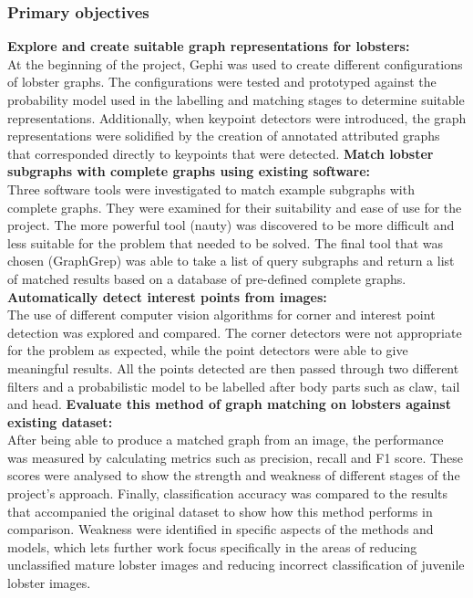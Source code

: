 \subsubsection{Primary objectives}
\textbf{Explore and create suitable graph representations for lobsters:} \\
At the beginning of the project, Gephi was used to create different configurations of lobster graphs. The configurations were tested and prototyped against the probability model used in the labelling and matching stages to determine suitable representations. Additionally, when keypoint detectors were introduced, the graph representations were solidified by the creation of annotated attributed graphs that corresponded directly to keypoints that were detected. 
\n
\textbf{Match lobster subgraphs with complete graphs using existing software:} \\
Three software tools were investigated to match example subgraphs with complete graphs. They were examined for their suitability and ease of use for the project. The more powerful tool (nauty) was discovered to be more difficult and less suitable for the problem that needed to be solved. The final tool that was chosen (GraphGrep) was able to take a list of query subgraphs and return a list of matched results based on a database of pre-defined complete graphs. 
\n
\textbf{Automatically detect interest points from images:} \\
The use of different computer vision algorithms for corner and interest point detection was explored and compared. The corner detectors were not appropriate for the problem as expected, while the point detectors were able to give meaningful results. All the points detected are then passed through two different filters and a probabilistic model to be labelled after body parts such as claw, tail and head. 
\n
\textbf{Evaluate this method of graph matching on lobsters against existing dataset:} \\
After being able to produce a matched graph from an image, the performance was measured by calculating metrics such as precision, recall and F1 score. These scores were analysed to show the strength and weakness of different stages of the project's approach. Finally, classification accuracy was compared to the results that accompanied the original dataset to show how this method performs in comparison. Weakness were identified in specific aspects of the methods and models, which lets further work focus specifically in the areas of reducing unclassified mature lobster images and reducing incorrect classification of juvenile lobster images.


